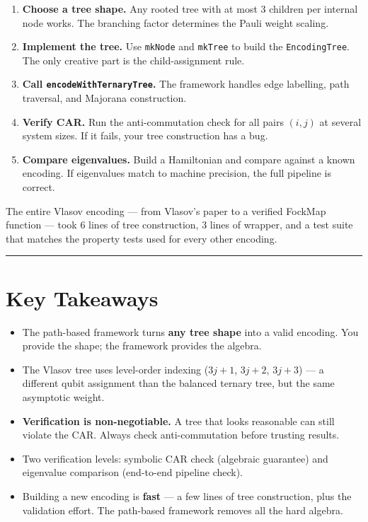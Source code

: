 \documentclass[
  11pt,
  oneside]{book}
\providecommand{\tightlist}{%
  \setlength{\itemsep}{0pt}\setlength{\parskip}{0pt}}
\begin{document}
\begin{enumerate}
\def\labelenumi{\arabic{enumi}.}
\item
  \textbf{Choose a tree shape.} Any rooted tree with at most 3 children
  per internal node works. The branching factor determines the Pauli
  weight scaling.
\item
  \textbf{Implement the tree.} Use \texttt{mkNode} and \texttt{mkTree}
  to build the \texttt{EncodingTree}. The only creative part is the
  child-assignment rule.
\item
  \textbf{Call \texttt{encodeWithTernaryTree}.} The framework handles
  edge labelling, path traversal, and Majorana construction.
\item
  \textbf{Verify CAR.} Run the anti-commutation check for all pairs
  \((i, j)\) at several system sizes. If it fails, your tree
  construction has a bug.
\item
  \textbf{Compare eigenvalues.} Build a Hamiltonian and compare against
  a known encoding. If eigenvalues match to machine precision, the full
  pipeline is correct.
\end{enumerate}

The entire Vlasov encoding --- from Vlasov's paper to a verified FockMap
function --- took 6 lines of tree construction, 3 lines of wrapper, and
a test suite that matches the property tests used for every other
encoding.

\begin{center}\rule{0.5\linewidth}{0.5pt}\end{center}

\section{Key Takeaways}\label{key-takeaways-7}

\begin{itemize}
\tightlist
\item
  The path-based framework turns \textbf{any tree shape} into a valid
  encoding. You provide the shape; the framework provides the algebra.
\item
  The Vlasov tree uses level-order indexing (\(3j+1\), \(3j+2\),
  \(3j+3\)) --- a different qubit assignment than the balanced ternary
  tree, but the same asymptotic weight.
\item
  \textbf{Verification is non-negotiable.} A tree that looks reasonable
  can still violate the CAR. Always check anti-commutation before
  trusting results.
\item
  Two verification levels: symbolic CAR check (algebraic guarantee) and
  eigenvalue comparison (end-to-end pipeline check).
\item
  Building a new encoding is \textbf{fast} --- a few lines of tree
  construction, plus the validation effort. The path-based framework
  removes all the hard algebra.
\end{itemize}
\end{document}
